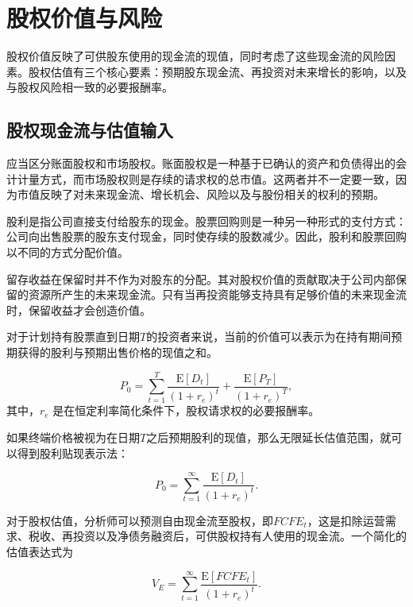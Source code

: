 \section{股权价值与风险}

股权价值反映了可供股东使用的现金流的现值，同时考虑了这些现金流的风险因素。股权估值有三个核心要素：预期股东现金流、再投资对未来增长的影响，以及与股权风险相一致的必要报酬率。

\subsection{股权现金流与估值输入}

应当区分账面股权和市场股权。账面股权是一种基于已确认的资产和负债得出的会计计量方式，而市场股权则是存续的请求权的总市值。这两者并不一定要一致，因为市值反映了对未来现金流、增长机会、风险以及与股份相关的权利的预期。

股利是指公司直接支付给股东的现金。股票回购则是一种另一种形式的支付方式：公司向出售股票的股东支付现金，同时使存续的股数减少。因此，股利和股票回购以不同的方式分配价值。

留存收益在保留时并不作为对股东的分配。其对股权价值的贡献取决于公司内部保留的资源所产生的未来现金流。只有当再投资能够支持具有足够价值的未来现金流时，保留收益才会创造价值。

对于计划持有股票直到日期\(T\)的投资者来说，当前的价值可以表示为在持有期间预期获得的股利与预期出售价格的现值之和。

\begin{equation}
P_0
=
\sum_{t=1}^{T}
\frac{\mathrm{E}[D_t]}{(1+r_e)^t}
+
\frac{\mathrm{E}[P_T]}{(1+r_e)^T},
\label{eq:ch9-finite-horizon-equity-value}
\end{equation}
其中，\(r_e\) 是在恒定利率简化条件下，股权请求权的必要报酬率。

如果终端价格被视为在日期$T$之后预期股利的现值，那么无限延长估值范围，就可以得到股利贴现表示法：

\begin{equation}
P_0
=
\sum_{t=1}^{\infty}
\frac{\mathrm{E}[D_t]}{(1+r_e)^t}.
\label{eq:ch9-dividend-discount-model}
\end{equation}


对于股权估值，分析师可以预测自由现金流至股权，即\(FCFE_t\)，这是扣除运营需求、税收、再投资以及净债务融资后，可供股权持有人使用的现金流。一个简化的估值表达式为

\begin{equation}
V_E
=
\sum_{t=1}^{\infty}
\frac{\mathrm{E}[FCFE_t]}{(1+r_e)^t}.
\label{eq:ch9-fcfe-valuation}
\end{equation}

